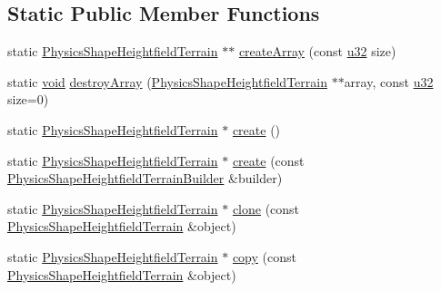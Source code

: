 \subsection*{Static Public Member Functions}
\begin{DoxyCompactItemize}
\item 
static \mbox{\hyperlink{classnjli_1_1_physics_shape_heightfield_terrain}{Physics\+Shape\+Heightfield\+Terrain}} $\ast$$\ast$ \mbox{\hyperlink{classnjli_1_1_physics_shape_heightfield_terrain_a8d02dc48f9dd364228890b24691f3632}{create\+Array}} (const \mbox{\hyperlink{_util_8h_a10e94b422ef0c20dcdec20d31a1f5049}{u32}} size)
\item 
static \mbox{\hyperlink{_thread_8h_af1e856da2e658414cb2456cb6f7ebc66}{void}} \mbox{\hyperlink{classnjli_1_1_physics_shape_heightfield_terrain_a57337f8e719788b8f00862a6158f41f6}{destroy\+Array}} (\mbox{\hyperlink{classnjli_1_1_physics_shape_heightfield_terrain}{Physics\+Shape\+Heightfield\+Terrain}} $\ast$$\ast$array, const \mbox{\hyperlink{_util_8h_a10e94b422ef0c20dcdec20d31a1f5049}{u32}} size=0)
\item 
static \mbox{\hyperlink{classnjli_1_1_physics_shape_heightfield_terrain}{Physics\+Shape\+Heightfield\+Terrain}} $\ast$ \mbox{\hyperlink{classnjli_1_1_physics_shape_heightfield_terrain_a99221bc00751a5b39af56a9500b40e5c}{create}} ()
\item 
static \mbox{\hyperlink{classnjli_1_1_physics_shape_heightfield_terrain}{Physics\+Shape\+Heightfield\+Terrain}} $\ast$ \mbox{\hyperlink{classnjli_1_1_physics_shape_heightfield_terrain_a1427cac41a5689ea2acf85fcd9fe3845}{create}} (const \mbox{\hyperlink{classnjli_1_1_physics_shape_heightfield_terrain_builder}{Physics\+Shape\+Heightfield\+Terrain\+Builder}} \&builder)
\item 
static \mbox{\hyperlink{classnjli_1_1_physics_shape_heightfield_terrain}{Physics\+Shape\+Heightfield\+Terrain}} $\ast$ \mbox{\hyperlink{classnjli_1_1_physics_shape_heightfield_terrain_a965bf005222bec5d75310ffed11d621a}{clone}} (const \mbox{\hyperlink{classnjli_1_1_physics_shape_heightfield_terrain}{Physics\+Shape\+Heightfield\+Terrain}} \&object)
\item 
static \mbox{\hyperlink{classnjli_1_1_physics_shape_heightfield_terrain}{Physics\+Shape\+Heightfield\+Terrain}} $\ast$ \mbox{\hyperlink{classnjli_1_1_physics_shape_heightfield_terrain_a090478c6886514727ac2462f2f7ff6c3}{copy}} (const \mbox{\hyperlink{classnjli_1_1_physics_shape_heightfield_terrain}{Physics\+Shape\+Heightfield\+Terrain}} \&object)
\item 

\end{DoxyCompactItemize}
